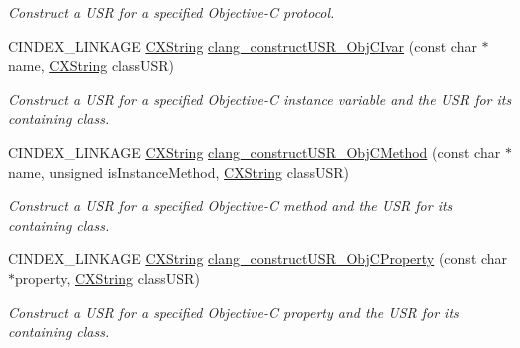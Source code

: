 \begin{DoxyCompactItemize}
\begin{DoxyCompactList}\small\item\em Construct a U\+SR for a specified Objective-\/C protocol. \end{DoxyCompactList}\item 
\mbox{\label{group__CINDEX__CURSOR__XREF_ga91dcb69a0378fcef6d21ac0be6c0038a}} 
C\+I\+N\+D\+E\+X\+\_\+\+L\+I\+N\+K\+A\+GE \mbox{\hyperlink{structCXString}{C\+X\+String}} \mbox{\hyperlink{group__CINDEX__CURSOR__XREF_ga91dcb69a0378fcef6d21ac0be6c0038a}{clang\+\_\+construct\+U\+S\+R\+\_\+\+Obj\+C\+Ivar}} (const char $\ast$name, \mbox{\hyperlink{structCXString}{C\+X\+String}} class\+U\+SR)
\begin{DoxyCompactList}\small\item\em Construct a U\+SR for a specified Objective-\/C instance variable and the U\+SR for its containing class. \end{DoxyCompactList}\item 
\mbox{\label{group__CINDEX__CURSOR__XREF_ga8f3065868eb56e24a6467703fa28a054}} 
C\+I\+N\+D\+E\+X\+\_\+\+L\+I\+N\+K\+A\+GE \mbox{\hyperlink{structCXString}{C\+X\+String}} \mbox{\hyperlink{group__CINDEX__CURSOR__XREF_ga8f3065868eb56e24a6467703fa28a054}{clang\+\_\+construct\+U\+S\+R\+\_\+\+Obj\+C\+Method}} (const char $\ast$name, unsigned is\+Instance\+Method, \mbox{\hyperlink{structCXString}{C\+X\+String}} class\+U\+SR)
\begin{DoxyCompactList}\small\item\em Construct a U\+SR for a specified Objective-\/C method and the U\+SR for its containing class. \end{DoxyCompactList}\item 
\mbox{\label{group__CINDEX__CURSOR__XREF_gac19f0c8de7e33a98723b336472e67e0c}} 
C\+I\+N\+D\+E\+X\+\_\+\+L\+I\+N\+K\+A\+GE \mbox{\hyperlink{structCXString}{C\+X\+String}} \mbox{\hyperlink{group__CINDEX__CURSOR__XREF_gac19f0c8de7e33a98723b336472e67e0c}{clang\+\_\+construct\+U\+S\+R\+\_\+\+Obj\+C\+Property}} (const char $\ast$property, \mbox{\hyperlink{structCXString}{C\+X\+String}} class\+U\+SR)
\begin{DoxyCompactList}\small\item\em Construct a U\+SR for a specified Objective-\/C property and the U\+SR for its containing class. \end{DoxyCompactList}\item 

\end{DoxyCompactItemize}
